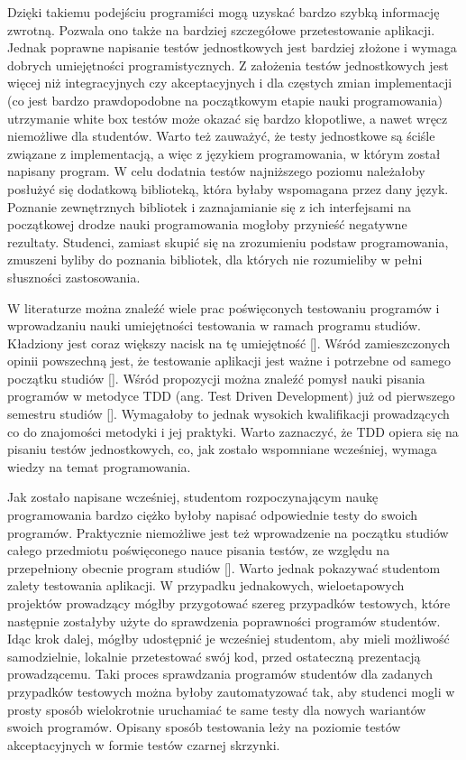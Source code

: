 Dzięki takiemu podejściu programiści mogą uzyskać bardzo szybką informację zwrotną.
Pozwala ono także na bardziej szczegółowe przetestowanie aplikacji.
Jednak poprawne napisanie testów jednostkowych jest bardziej złożone i wymaga dobrych umiejętności programistycznych.
Z założenia testów jednostkowych jest więcej niż integracyjnych czy akceptacyjnych i dla częstych zmian implementacji (co jest bardzo prawdopodobne na początkowym etapie nauki programowania) utrzymanie white box testów może okazać się bardzo kłopotliwe, a nawet wręcz niemożliwe dla studentów.
Warto też zauważyć, że testy jednostkowe są ściśle związane z implementacją, a więc z językiem programowania, w którym został napisany program.
W celu dodatnia testów najniższego poziomu należałoby posłużyć się dodatkową biblioteką, która byłaby wspomagana przez dany język.
Poznanie zewnętrznych bibliotek i zaznajamianie się z ich interfejsami na początkowej drodze nauki programowania mogłoby przynieść negatywne rezultaty.
Studenci, zamiast skupić się na zrozumieniu podstaw programowania, zmuszeni byliby do poznania bibliotek, dla których nie rozumieliby w pełni słuszności zastosowania.

W literaturze można znaleźć wiele prac poświęconych testowaniu programów i wprowadzaniu nauki umiejętności testowania w ramach programu studiów.
Kładziony jest coraz większy nacisk na tę umiejętność [].
Wśród zamieszczonych opinii powszechną jest, że testowanie aplikacji jest ważne i potrzebne od samego początku studiów [].
Wśród propozycji można znaleźć pomysł nauki pisania programów w metodyce TDD (ang. Test Driven Development) już od pierwszego semestru studiów [].
Wymagałoby to jednak wysokich kwalifikacji prowadzących co do znajomości metodyki i jej praktyki.
Warto zaznaczyć, że TDD opiera się na pisaniu testów jednostkowych, co, jak zostało wspomniane wcześniej, wymaga wiedzy na temat programowania.

Jak zostało napisane wcześniej, studentom rozpoczynającym naukę programowania bardzo ciężko byłoby napisać odpowiednie testy do swoich programów.
Praktycznie niemożliwe jest też wprowadzenie na początku studiów całego przedmiotu poświęconego nauce pisania testów, ze względu na przepełniony obecnie program studiów [].
Warto jednak pokazywać studentom zalety testowania aplikacji.
W przypadku jednakowych, wieloetapowych projektów prowadzący mógłby przygotować szereg przypadków testowych, które następnie zostałyby użyte do sprawdzenia poprawności programów studentów.
Idąc krok dalej, mógłby udostępnić je wcześniej studentom, aby mieli możliwość samodzielnie, lokalnie przetestować swój kod, przed ostateczną prezentacją prowadzącemu.
Taki proces sprawdzania programów studentów dla zadanych przypadków testowych można byłoby zautomatyzować tak, aby studenci mogli w prosty sposób wielokrotnie uruchamiać te same testy dla nowych wariantów swoich programów.
Opisany sposób testowania leży na poziomie testów akceptacyjnych w formie testów czarnej skrzynki.

